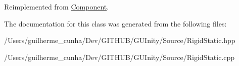 Reimplemented from \hyperlink{class_component_a72d67b02e6733c1a6fb73cbaaf8ebff4}{Component}.



The documentation for this class was generated from the following files\+:\begin{DoxyCompactItemize}
\item 
/\+Users/guilherme\+\_\+cunha/\+Dev/\+G\+I\+T\+H\+U\+B/\+G\+U\+Inity/\+Source/Rigid\+Static.\+hpp\item 
/\+Users/guilherme\+\_\+cunha/\+Dev/\+G\+I\+T\+H\+U\+B/\+G\+U\+Inity/\+Source/Rigid\+Static.\+cpp\end{DoxyCompactItemize}
